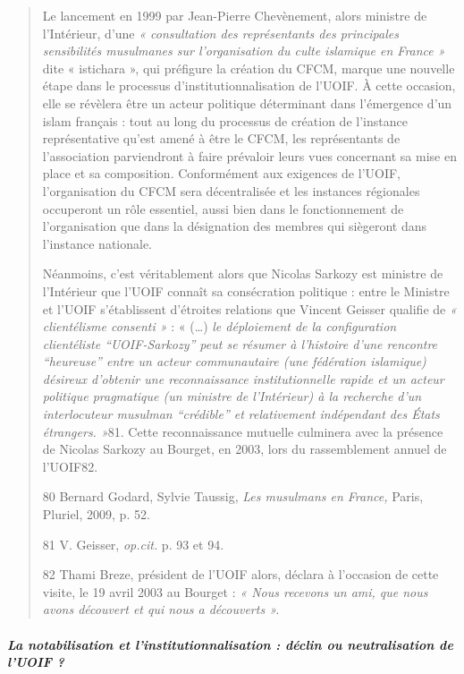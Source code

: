 \begin{quote}
Le lancement en 1999 par Jean-Pierre Chevènement, alors ministre de
l'Intérieur, d'une \emph{« consultation des représentants des
principales sensibilités musulmanes sur l'organisation du culte
islamique en France »} dite « istichara », qui préfigure la création du
CFCM, marque une nouvelle étape dans le processus
d'institutionnalisation de l'UOIF. À cette occasion, elle se révèlera
être un acteur politique déterminant dans l'émergence d'un islam
français : tout au long du processus de création de l'instance
représentative qu'est amené à être le CFCM, les représentants de
l'association parviendront à faire prévaloir leurs vues concernant sa
mise en place et sa composition. Conformément aux exigences de l'UOIF,
l'organisation du CFCM sera décentralisée et les instances régionales
occuperont un rôle essentiel, aussi bien dans le fonctionnement de
l'organisation que dans la désignation des membres qui siègeront dans
l'instance nationale.

Néanmoins, c'est véritablement alors que Nicolas Sarkozy est ministre de
l'Intérieur que l'UOIF connaît sa consécration politique : entre le
Ministre et l'UOIF s'établissent d'étroites relations que Vincent
Geisser qualifie de \emph{« clientélisme consenti »} : « (\ldots)
\emph{le déploiement de la configuration clientéliste ``UOIF-Sarkozy''
peut se résumer à l'histoire d'une rencontre ``heureuse'' entre un
acteur communautaire (une fédération islamique) désireux d'obtenir une
reconnaissance institutionnelle rapide et un acteur politique
pragmatique (un ministre de l'Intérieur) à la recherche d'un
interlocuteur musulman ``crédible'' et relativement indépendant des
États étrangers. »}81. Cette reconnaissance mutuelle culminera avec la
présence de Nicolas Sarkozy au Bourget, en 2003, lors du rassemblement
annuel de l'UOIF82.

80 Bernard Godard, Sylvie Taussig, \emph{Les musulmans en France,}
Paris, Pluriel, 2009, p. 52.

81 V. Geisser, \emph{op.cit.} p. 93 et 94.

82 Thami Breze, président de l'UOIF alors, déclara à l'occasion de cette
visite, le 19 avril 2003 au Bourget : \emph{« Nous recevons un ami, que
nous avons découvert et qui nous a découverts ».}


\end{quote}

\hypertarget{la-notabilisation-et-linstitutionnalisation-duxe9clin-ou-neutralisation-de-luoif}{%
\subparagraph{La notabilisation et l'institutionnalisation : déclin ou
neutralisation de l'UOIF
?}\label{la-notabilisation-et-linstitutionnalisation-duxe9clin-ou-neutralisation-de-luoif}}

